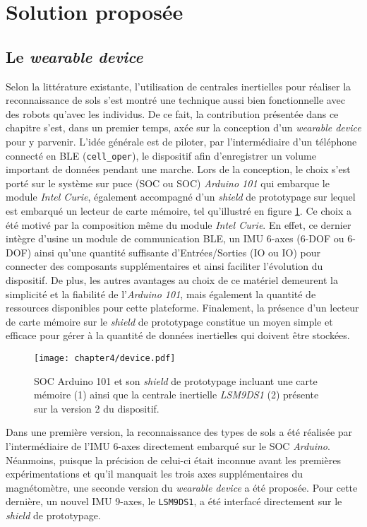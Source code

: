 \section{Solution proposée}

\subsection{Le \textit{wearable device}}

Selon la littérature existante, l'utilisation de centrales inertielles pour réaliser la reconnaissance de sols s'est montré une technique aussi bien fonctionnelle avec des robots qu'avec les individus. De ce fait, la contribution présentée dans ce chapitre s'est, dans un premier temps, axée sur la conception d'un \textit{wearable device} pour y parvenir. L'idée générale est de piloter, par l'intermédiaire d'un téléphone connecté en \acs{BLE} (\texttt{cell\_oper}), le dispositif afin d'enregistrer un volume important de données pendant une marche. Lors de la conception, le choix s'est porté sur le système sur puce (\acl{SOC} ou \acs{SOC}) \textit{Arduino 101} qui embarque le module \textit{Intel Curie}, également accompagné d'un \textit{shield} de prototypage sur lequel est embarqué un lecteur de carte mémoire, tel qu'illustré en figure \ref{fig:device}. Ce choix a été motivé par la composition même du module \textit{Intel Curie}. En effet, ce dernier intègre d'usine un module de communication \acs{BLE}, un \acs{IMU} 6-axes (6-\acl{DOF} ou 6-\acs{DOF}) ainsi qu'une quantité suffisante d'Entrées/Sorties (\acl{IO} ou \acs{IO}) pour connecter des composants supplémentaires et ainsi faciliter l'évolution du dispositif. De plus, les autres avantages au choix de ce matériel demeurent la simplicité et la fiabilité de l'\textit{Arduino 101}, mais également la quantité de ressources disponibles pour cette plateforme. Finalement, la présence d'un lecteur de carte mémoire sur le \textit{shield} de prototypage constitue un moyen simple et efficace pour gérer à la quantité de données inertielles qui doivent être stockées.

\begin{figure}[b!]
	\centering
	\texttt{[image: chapter4/device.pdf]}
        \caption{\acs{SOC} Arduino 101 et son \textit{shield} de prototypage incluant une carte mémoire (1) ainsi que la centrale inertielle \textit{LSM9DS1} (2) présente sur la version 2 du dispositif.}
	\label{fig:device}
\end{figure}

Dans une première version, la reconnaissance des types de sols a été réalisée par l'intermédiaire de l'IMU 6-axes directement embarqué sur le \acs{SOC} \textit{Arduino}. Néanmoins, puisque la précision de celui-ci était inconnue avant les premières expérimentations et qu'il manquait les trois axes supplémentaires du magnétomètre, une seconde version du \textit{wearable device} a été proposée. Pour cette dernière, un nouvel IMU 9-axes, le \texttt{LSM9DS1}, a été interfacé directement sur le \textit{shield} de prototypage.

